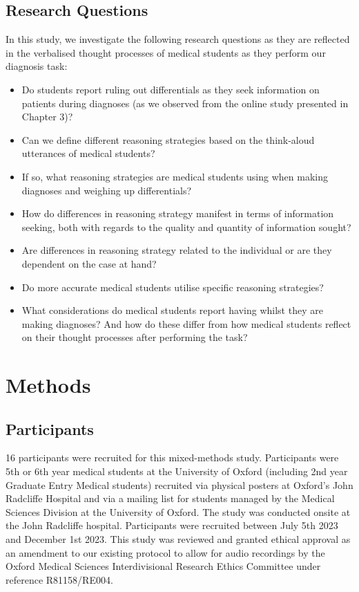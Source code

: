 \documentclass[a4paper, nobind]{templates/ociamthesis}
\providecommand{\tightlist}{%
  \setlength{\itemsep}{0pt}\setlength{\parskip}{0pt}}
\begin{document}
\subsection{Research Questions}\label{research-questions-1}

In this study, we investigate the following research questions as they are reflected in the verbalised thought processes of medical students as they perform our diagnosis task:

\begin{itemize}
\tightlist
\item
  Do students report ruling out differentials as they seek information on patients during diagnoses (as we observed from the online study presented in Chapter 3)?
\item
  Can we define different reasoning strategies based on the think-aloud utterances of medical students?
\item
  If so, what reasoning strategies are medical students using when making diagnoses and weighing up differentials?
\item
  How do differences in reasoning strategy manifest in terms of information seeking, both with regards to the quality and quantity of information sought?
\item
  Are differences in reasoning strategy related to the individual or are they dependent on the case at hand?
\item
  Do more accurate medical students utilise specific reasoning strategies?
\item
  What considerations do medical students report having whilst they are making diagnoses? And how do these differ from how medical students reflect on their thought processes after performing the task?
\end{itemize}

\section{Methods}\label{methods-2}

\subsection{Participants}\label{participants-1}

16 participants were recruited for this mixed-methods study. Participants were 5th or 6th year medical students at the University of Oxford (including 2nd year Graduate Entry Medical students) recruited via physical posters at Oxford's John Radcliffe Hospital and via a mailing list for students managed by the Medical Sciences Division at the University of Oxford. The study was conducted onsite at the John Radcliffe hospital. Participants were recruited between July 5th 2023 and December 1st 2023. This study was reviewed and granted ethical approval as an amendment to our existing protocol to allow for audio recordings by the Oxford Medical Sciences Interdivisional Research Ethics Committee under reference R81158/RE004.
\end{document}
